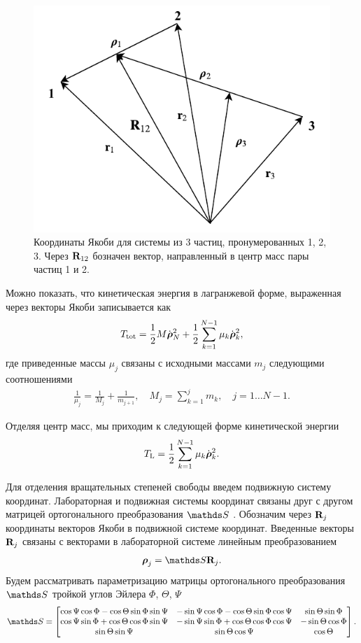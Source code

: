\begin{figure}
    \centering
    \includegraphics[width=0.5\linewidth]{pictures/jacobi_coordinates.pdf}
    \caption{Координаты Якоби  для системы из 3 частиц, пронумерованных 1, 2, 3. Через $\mathbf{R}_{12}$ бозначен вектор, направленный в центр масс пары частиц 1 и 2.}
    \label{fig:jacobi_coordinates}
\end{figure}

Можно показать, что кинетическая энергия в лагранжевой форме, выраженная через векторы Якоби записывается как \cite{greiner} 
\begin{gather}
    T_\text{tot} = \frac{1}{2} M \dot{\boldsymbol{\rho}}_N^2 + \frac{1}{2} \sum_{k = 1}^{N - 1} \mu_k \dot{\boldsymbol{\rho}}_k^2,
\end{gather}
%
где приведенные массы $\mu_j$ связаны с исходными массами $m_j$ следующими соотношениями
\begin{gather}
    \frac{1}{\mu_j} = \frac{1}{M_j} + \frac{1}{m_{j+1}}, \quad M_j = \sum_{k = 1}^j m_k, \quad j = 1 \dots N - 1. \label{polyatom-jacobi-masses}
\end{gather}

Отделяя центр масс, мы приходим к следующей форме кинетической энергии
\begin{gather}
    T_\text{L} = \frac{1}{2} \sum_{k = 1}^{N - 1} \mu_k \dot{\boldsymbol{\rho}}_k^2.
\end{gather}

Для отделения вращательных степеней свободы введем подвижную систему координат. Лабораторная и подвижная системы координат связаны друг с другом матрицей ортогонального преобразования $\bbS$ \cite{goldstein}. Обозначим через $\mathbf{R}_j$ координаты векторов Якоби в подвижной системе координат. Введенные векторы $\mathbf{R}_j$ связаны с векторами в лабораторной системе линейным преобразованием
\begin{gather}
    \boldsymbol{\rho}_j = \bbS \mf{R}_j.
\end{gather}
Будем рассматривать параметризацию матрицы ортогонального преобразования $\bbS$ тройкой углов Эйлера $\Phi$, $\Theta$, $\Psi$ \cite{goldstein}
\begin{gather}
    \bbS = 
    \begin{bmatrix}
        \cos \Psi \cos \Phi - \cos \Theta \sin \Phi \sin \Psi & -\sin \Psi \cos \Phi - \cos \Theta \sin \Phi \cos \Psi & \sin \Theta \sin \Phi \\ 
        \cos \Psi \sin \Phi + \cos \Theta \cos \Phi \sin \Psi & -\sin \Psi \sin \Phi + \cos \Theta \cos \Phi \cos \Psi & - \sin \Theta \cos \Phi \\
        \sin \Theta \sin \Psi & \sin \Theta \cos \Psi & \cos \Theta
    \end{bmatrix}.
\end{gather}

